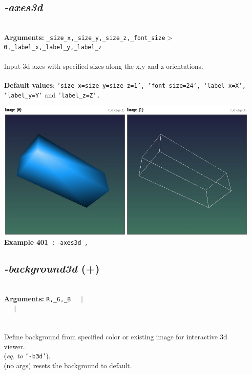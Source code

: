 \documentclass[a4paper,11pt,twoside]{book}
\begin{document}
\subsection{\emph{-axes3d} }\vspace*{-0.5em}
~\\\textbf{Arguments: } 
{\small \texttt{\_size\_x,\_size\_y,\_size\_z,\_font\_size$>$0,\_label\_x,\_label\_y,\_label\_z}}\\~\\
Input 3d axes with specified sizes along the x,y and z orientations.
~\\~\\\textbf{Default values}: {\small \texttt{'size\_x=size\_y=size\_z=1', 'font\_size=24', 'label\_x=X', 'label\_y=Y'} and \texttt{'label\_z=Z'.}}
\begin{center}\includegraphics[keepaspectratio=true,height=7cm,width=\textwidth]{img/gmic_def401.jpg}\\
{\footnotesize \textbf{Example 401~:} \texttt{-axes3d ,}}
\end{center}

\subsection{\emph{-background3d} (+)}\vspace*{-0.5em}
~\\\textbf{Arguments: } 
{\small \texttt{R,\_G,\_B}}~~~$|$\\
\hspace*{2.2cm}{\small \texttt{[image]}}~~~$|$\\
\\~\\
Define background from specified color or existing image for interactive 3d viewer.
~\\(\emph{eq. to} {\small \texttt{'-b3d'}}).
~\\(no args) resets the background to default.
\end{document}
